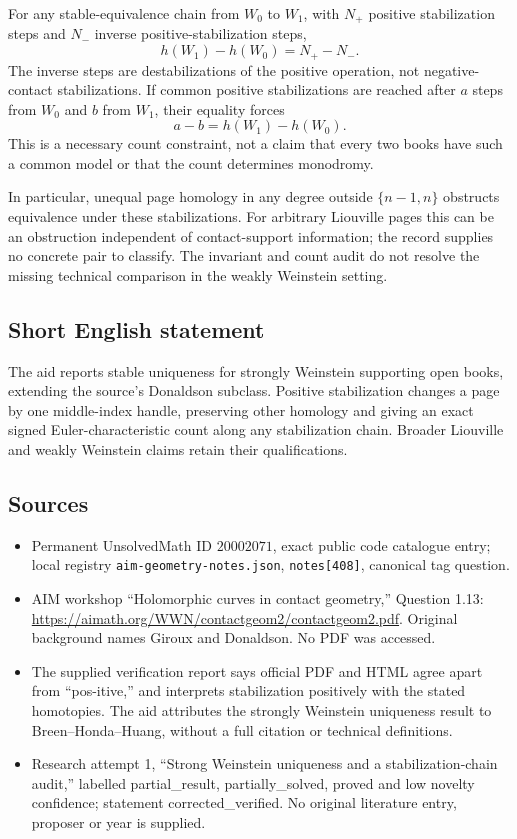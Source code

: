 \documentclass[11pt]{article}
\begin{document}
For any stable-equivalence chain from \(W_0\) to \(W_1\), with \(N_+\) positive stabilization steps and \(N_-\) inverse positive-stabilization steps,
\[
 h(W_1)-h(W_0)=N_+-N_-.
\]
The inverse steps are destabilizations of the positive operation, not negative-contact stabilizations. If common positive stabilizations are reached after \(a\) steps from \(W_0\) and \(b\) from \(W_1\), their equality forces
\[
 a-b=h(W_1)-h(W_0).
\]
This is a necessary count constraint, not a claim that every two books have such a common model or that the count determines monodromy.

In particular, unequal page homology in any degree outside \(\{n-1,n\}\) obstructs equivalence under these stabilizations. For arbitrary Liouville pages this can be an obstruction independent of contact-support information; the record supplies no concrete pair to classify. The invariant and count audit do not resolve the missing technical comparison in the weakly Weinstein setting.
\subsection{Short English statement}
The aid reports stable uniqueness for strongly Weinstein supporting open books, extending the source's Donaldson subclass. Positive stabilization changes a page by one middle-index handle, preserving other homology and giving an exact signed Euler-characteristic count along any stabilization chain. Broader Liouville and weakly Weinstein claims retain their qualifications.
\subsection{Sources}
\begin{itemize}
\item Permanent UnsolvedMath ID \(20002071\), exact public code catalogue entry; local registry \texttt{aim-geometry-notes.json}, \texttt{notes[408]}, canonical tag question.
\item AIM workshop ``Holomorphic curves in contact geometry,'' Question 1.13: \url{https://aimath.org/WWN/contactgeom2/contactgeom2.pdf}. Original background names Giroux and Donaldson. No PDF was accessed.
\item The supplied verification report says official PDF and HTML agree apart from ``pos-itive,'' and interprets stabilization positively with the stated homotopies. The aid attributes the strongly Weinstein uniqueness result to Breen--Honda--Huang, without a full citation or technical definitions.
\item Research attempt 1, ``Strong Weinstein uniqueness and a stabilization-chain audit,'' labelled partial\_result, partially\_solved, proved and low novelty confidence; statement corrected\_verified. No original literature entry, proposer or year is supplied.
\end{itemize}
\end{document}
